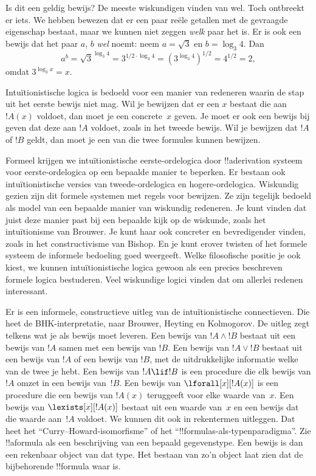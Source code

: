\documentclass[../../../include/open-logic-section]{subfiles}
\begin{document}
Is dit een geldig bewijs? De meeste wiskundigen vinden van wel. Toch ontbreekt er
iets. We hebben bewezen dat er een paar reële getallen met de gevraagde
eigenschap bestaat, maar we kunnen niet zeggen \emph{welk} paar het is. Er is ook
een bewijs dat het paar $a$, $b$ \emph{wel} noemt: neem $a = \sqrt{3}$ en
$b = \log_3 4$. Dan
\[
a^b = \sqrt{3}^{\log_3 4} = 3^{1/2 \cdot \log_3 4} = (3^{\log_3
  4})^{1/2} = 4^{1/2}= 2,
\]
omdat $3^{\log_3 x} = x$.

Intuïtionistische logica is bedoeld voor een manier van redeneren waarin de stap
uit het eerste bewijs niet mag. Wil je bewijzen dat er een $x$ bestaat die
aan~$!A(x)$ voldoet, dan moet je een concrete~$x$ geven. Je moet er ook een bewijs
bij geven dat deze aan $!A$ voldoet, zoals in het tweede bewijs. Wil je bewijzen
dat $!A$ of $!B$ geldt, dan moet je een van die twee formules kunnen bewijzen.

Formeel krijgen we intuïtionistische eerste-ordelogica door !!a{derivation}
systeem voor eerste-ordelogica op een bepaalde manier te beperken. Er bestaan
ook intuïtionistische versies van tweede-ordelogica en hogere-ordelogica.
Wiskundig gezien zijn dit formele systemen met regels voor bewijzen. Ze zijn
tegelijk bedoeld als model van een bepaalde manier van wiskundig redeneren. Je
kunt vinden dat juist deze manier past bij een bepaalde kijk op de wiskunde,
zoals het intuïtionisme van Brouwer. Je kunt haar ook concreter en
bevredigender vinden, zoals in het constructivisme van Bishop. En je kunt erover
twisten of het formele systeem de informele bedoeling goed weergeeft. Welke
filosofische positie je ook kiest, we kunnen intuïtionistische logica gewoon als
een precies beschreven formele logica bestuderen. Veel wiskundige logici vinden
dat om allerlei redenen interessant.

Er is een informele, constructieve uitleg van de intuïtionistische connectieven.
Die heet de BHK-interpretatie, naar Brouwer, Heyting en Kolmogorov. De uitleg
zegt telkens wat je als bewijs moet leveren. Een bewijs van $!A \land !B$ bestaat
uit een bewijs van $!A$ samen met een bewijs van $!B$. Een bewijs van $!A \lor !B$
bestaat uit een bewijs van $!A$ of een bewijs van $!B$, met de uitdrukkelijke
informatie welke van de twee je hebt. Een bewijs van $!A \lif !B$ is een
procedure die elk bewijs van $!A$ omzet in een bewijs van~$!B$. Een bewijs van
$\lforall[x][!A(x)]$ is een procedure die een bewijs van $!A(x)$ teruggeeft voor
elke waarde van~$x$. Een bewijs van $\lexists[x][!A(x)]$ bestaat uit een waarde
van~$x$ en een bewijs dat die waarde aan~$!A$ voldoet. We kunnen dit ook in
rekentermen uitleggen. Dat heet het ``Curry--Howard-isomorfisme'' of het
``!!{formula}s-als-typenparadigma''. Zie !!a{formula} als een beschrijving van een
bepaald gegevenstype. Een bewijs is dan een rekenbaar object van dat type. Het
bestaan van zo'n object laat zien dat de bijbehorende !!{formula} waar is.
\end{document}
